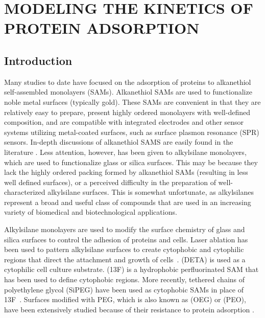 
\chapter{\texorpdfstring{MODELING THE KINETICS OF PROTEIN ADSORPTION}{CHAPTER . MODELING THE KINETICS OF PROTEIN ADSORPTION}}


\section{Introduction}

Many studies to date have focused on the adsorption of proteins to
alkanethiol self-assembled monolayers (SAMs). Alkanethiol SAMs are
used to functionalize noble metal surfaces (typically gold). These
SAMs are convenient in that they are relatively easy to prepare, present
highly ordered monolayers with well-defined composition, and are compatible
with integrated electrodes and other sensor systems utilizing metal-coated
surfaces, such as surface plasmon resonance (SPR) sensors. In-depth
discussions of alkanethiol SAMS are easily found in the literature
\cite{Love2005}. Less attention, however, has been given to alkylsilane
monolayers, which are used to functionalize glass or silica surfaces.
This may be because they lack the highly ordered packing formed by
alkanethiol SAMs (resulting in less well defined surfaces), or a perceived
difficulty in the preparation of well-characterized alkylsilane surfaces.
This is somewhat unfortunate, as alkylsilanes represent a broad and
useful class of compounds that are used in an increasing variety of
biomedical and biotechnological applications. 

Alkylsilane monolayers are used to modify the surface chemistry of
glass and silica surfaces to control the adhesion of proteins and
cells. Laser ablation has been used to pattern alkylsilane surfaces
to create cytophobic and cytophilic regions that direct the attachment
and growth of cells~\cite{Stenger1992}. 
(DETA) is used as a cytophilic cell culture substrate. 
(13F) is a hydrophobic perfluorinated SAM that has been used to define
cytophobic regions. More recently, tethered chains of polyethylene
glycol (SiPEG) have been used as cytophobic SAMs in place of 13F~\cite{Wilson2011a}.
Surfaces modified with PEG, which is also known as 
(OEG) or  (PEO), have been extensively
studied because of their resistance to protein adsorption \cite{Gombotz1991}.

